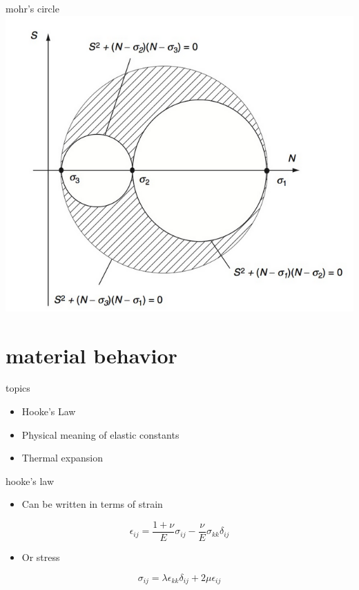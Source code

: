 \documentclass[
  letterpaper,
  ignorenonframetext,
  aspectratio=43,
  handout,
  12pt]{beamer}
\providecommand{\tightlist}{%
  \setlength{\itemsep}{0pt}\setlength{\parskip}{0pt}}
\providecommand{\tightlist}{%
\setlength{\itemsep}{0pt}\setlength{\parskip}{0pt}}
\let\Oldincludegraphics\includegraphics
\renewcommand{\includegraphics}[2][]{\Oldincludegraphics[width=\textwidth,height=0.7\textheight,keepaspectratio]{#2}}
\begin{document}
\begin{frame}{mohr's circle}
\protect\hypertarget{mohrs-circle-1}{}
\includegraphics{../images/mohr.PNG}
\end{frame}

\hypertarget{material-behavior}{%
\section{material behavior}\label{material-behavior}}

\begin{frame}{topics}
\protect\hypertarget{topics-1}{}
\begin{itemize}
\tightlist
\item
  Hooke's Law
\item
  Physical meaning of elastic constants
\item
  Thermal expansion
\end{itemize}
\end{frame}

\begin{frame}{hooke's law}
\protect\hypertarget{hookes-law}{}
\begin{itemize}
\tightlist
\item
  Can be written in terms of strain
\end{itemize}

\[\epsilon_{ij} = \frac{1+\nu}{E}\sigma_{ij} - \frac{\nu}{E}\sigma_{kk} \delta_{ij}\]

\begin{itemize}
\tightlist
\item
  Or stress
\end{itemize}

\[\sigma_{ij} = \lambda \epsilon_{kk}\delta_{ij} + 2\mu \epsilon_{ij}\]
\end{frame}
\end{document}
